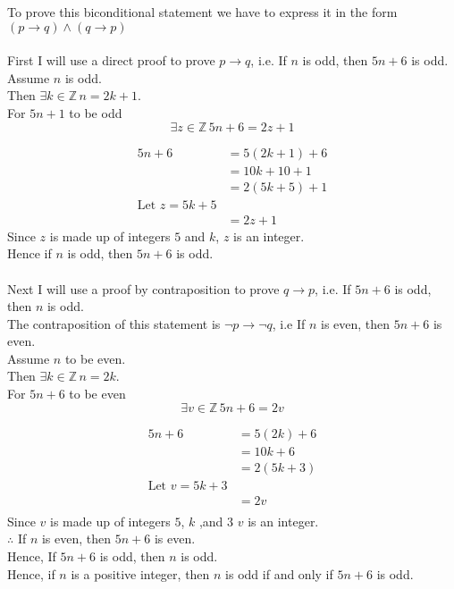 \documentclass[12pt letter]{report}
\begin{document}
\begin{myproof}
	To prove this biconditional statement we have to express it in the form $\left( p \to q \right) \wedge \left( q \to
		p\right)  $\\
	\\
	First I will use a direct proof to prove $p \to q$, i.e. If $n$ is odd, then $5n + 6$ is odd. \\
	Assume $n$ is odd. \\
	Then $\exists k \in \mathbb{Z} \, n = 2k+ 1$. \\
	For $5n + 1$ to be odd
	\[
		\exists z \in \mathbb{Z} \, 5n + 6 = 2z + 1
	\]

	\begin{align*}
		5n + 6 & = 5 \left( 2k + 1 \right)  + 6 \\
		       & = 10k + 10 + 1                 \\
		       & = 2 \left( 5k + 5 \right)  + 1 \\
		\text{Let } z = 5k + 5                  \\
		       & = 2z + 1
	\end{align*}
	Since $z$ is made up of integers $5$ and $k$, $z$ is an integer.\\
	Hence if $n$ is odd, then  $5n + 6$ is odd.\\
	\\

	\noindent Next I will use a proof by contraposition to prove $q \to p$, i.e. If $5n + 6$ is odd, then $n$ is odd.\\
	The contraposition of this statement is $\neg p \to \neg q $, i.e If $n$ is even, then $5n + 6$ is even.\\
	Assume $n$ to be even.\\
	Then $\exists k \in \mathbb{Z}\, n = 2k$.\\
	For $5n + 6$ to be even
	\[
		\exists v \in \mathbb{Z} \, 5n + 6 = 2v
	\]

	\begin{align*}
		5n + 6 & = 5 \left( 2k \right)  + 6 \\
		       & = 10k + 6                  \\
		       & = 2 \left( 5k + 3 \right)  \\
		\text{Let }v = 5k + 3               \\
		       & = 2v                       \\
	\end{align*}
	Since $v$ is made up of integers $5$, $k$ ,and $3$ $v$ is an integer.\\
	$\therefore$ If $n$ is even, then $5n + 6$ is even.\\
	Hence, If $5n + 6$ is odd, then $n$ is odd.
	\\
	Hence, if $n$ is a positive integer, then $n$ is odd if and only if $5n + 6$ is odd.


\end{myproof}
\end{document}
